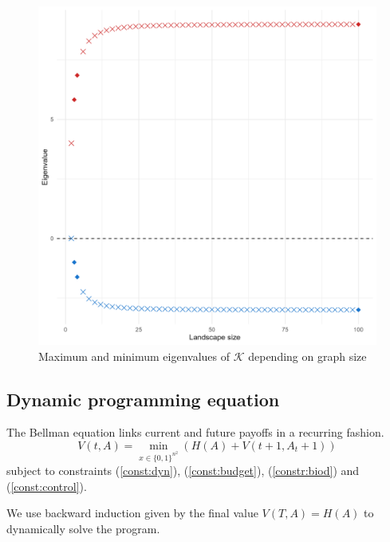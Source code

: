 \begin{figure}[H]
    \centering
    \includegraphics[width=0.8\linewidth]{figures/wildland/eigenvalues.png}
    \caption{Maximum and minimum eigenvalues of $\mathcal{K}$ depending on graph size}
    \label{fig:eigenvalues}
\end{figure}

\subsection{Dynamic programming equation}

The Bellman equation links current and future payoffs in a recurring fashion.
\begin{equation}
    V(t,A)= \min_{x\in\{0,1\}^{n^2}} \left(H(A) + V(t+1, A_t+1)\right)
\end{equation}
subject to constraints (\ref{const:dyn}), (\ref{const:budget}), (\ref{constr:biod}) and (\ref{const:control}). 

We use backward induction given by the final value $ V(T, A) = H(A)$ to dynamically solve the program. 


